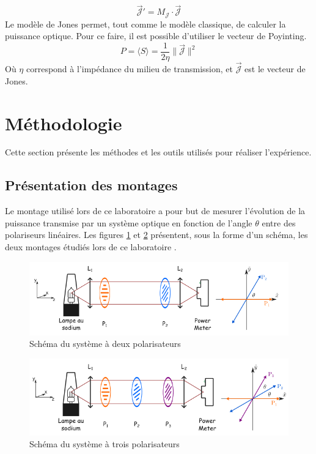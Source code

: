 \documentclass[11pt,letterpaper]{article}
\begin{document}
\begin{equation}\label{jonesm}
  \vec{\mathcal{J}}'=M_{\mathcal{J}}\cdot\vec{\mathcal{J}}
\end{equation}
Le modèle de Jones permet, tout comme le modèle classique, de calculer la puissance optique. Pour ce faire, il est possible d'utiliser le vecteur de Poyinting.
\begin{equation}
  P=\langle S\rangle=\frac{1}{2\eta}\|\vec{\mathcal{J}}\|^{2}
\end{equation}
Où $\eta$ correspond à l'impédance du milieu de transmission, et $\vec{\mathcal{J}}$ est le vecteur de Jones.

\section{Méthodologie}
Cette section présente les méthodes et les outils utilisés pour réaliser l'expérience.

\subsection{Présentation des montages}

Le montage utilisé lors de ce laboratoire a pour but de mesurer l'évolution de la puissance transmise par un système optique en fonction de l'angle $\theta$ entre des polariseurs linéaires. Les figures \ref{systeme a 2 polarisateur} et \ref{systeme a 3 polarisateur} présentent, sous la forme d'un schéma, les deux montages étudiés lors de ce laboratoire \cite{sheehy_experience_2024}.

\begin{figure}[H]
  \centering
        \includegraphics[scale=0.71]{Systeme2polarisateurs.png}
        \caption{Schéma du système à deux polarisateurs}
        \label{systeme a 2 polarisateur}
\end{figure}

\begin{figure}[H]
  \centering
        \includegraphics[scale=0.71]{Systeme3polarisateurs.png}
        \caption{Schéma du système à trois polarisateurs}
        \label{systeme a 3 polarisateur}
\end{figure}
\end{document}
